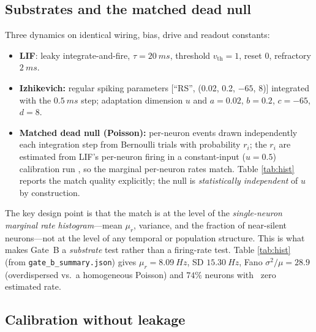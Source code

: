 \documentclass[10pt,a4paper]{article}
\begin{document}
\subsection{Substrates and the matched dead null}\label{sec:subs}

Three dynamics on identical wiring, bias, drive and readout constants:

\begin{itemize}[nosep]
\item \textbf{LIF}: leaky integrate-and-fire, $\tau=\SI{20}{ms}$,
threshold $v_{\mathrm{th}}=1$, reset $0$, refractory $\SI{2}{ms}$.
\item \textbf{Izhikevich:} regular spiking parameters [``RS'', (0.02,
0.2, $-65$, $8$)] integrated with the $\SI{0.5}{ms}$ step; adaptation
dimension $u$ and $a=0.02$, $b=0.2$, $c=-65$, $d=8$.
\item \textbf{Matched dead null (Poisson):} per-neuron events drawn
independently each integration step from Bernoulli trials with
probability $r_i$; the $r_i$ are estimated from LIF's per-neuron
firing in a constant-input ($u=0.5$) calibration run
\cite{theiler1992}, so the marginal per-neuron rates match. Table
\ref{tab:hist} reports the match quality explicitly; the null is
\emph{statistically independent} of $u$ by construction.
\end{itemize}

The key design point is that the match is at the level of the
\emph{single-neuron marginal rate histogram}---mean $\mu_r$, variance,
and the fraction of near-silent neurons---not at the level of any
temporal or population structure. This is what makes Gate~B a
\emph{substrate} test rather than a firing-rate test. Table
\ref{tab:hist} (from \texttt{gate\_b\_summary.json}) gives
$\mu_r=\SI{8.09}{Hz}$, SD $\SI{15.30}{Hz}$, Fano
$\sigma^2/\mu=28.9$ (overdispersed vs.\ a homogeneous Poisson) and
$74\%$ neurons with ~zero estimated rate.

\begin{table}[H]
\centering
\caption{Match quality of the dead null to the LIF marginal:
per-neuron mean rate, SD, Fano factor $\sigma^2/\mu$, and the silent
fraction (neuron with $\hat r_i\approx0$). The null draws Bernoulli
events at the matched per-neuron probabilities, independent of $u$.}
\label{tab:hist}

\end{table}

\subsection{Calibration without leakage}\label{sec:calib}
\end{document}
